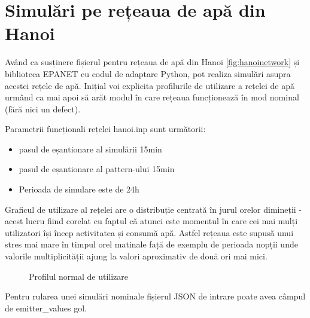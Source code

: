 

\section{Simulări pe rețeaua de apă din Hanoi}

Având ca susținere fișierul pentru rețeaua de apă din Hanoi \ref{fig:hanoinetwork} și biblioteca EPANET cu codul de
adaptare Python, pot realiza simulări asupra acestei rețele de apă. Inițial voi explicita profilurile de utilizare a
rețelei de apă urmând ca mai apoi să arăt modul în care rețeaua funcționează în mod nominal (fără nici un defect).

Parametrii funcționali rețelei hanoi.inp sunt următorii:

\begin{itemize}
    \item pasul de eșantionare al simulării 15min
    \item pasul de eșantionare al pattern-ului 15min
    \item Perioada de simulare este de 24h
\end{itemize}

Graficul de utilizare al rețelei are o distribuție centrată în jurul orelor dimineții - acest lucru fiind corelat cu faptul că atunci este momentul în care cei mai mulți utilizatori își încep activitatea și consumă apă. Astfel rețeaua este supusă unui stres mai mare în timpul orel matinale față de exemplu de perioada nopții unde valorile multiplicității ajung la valori aproximativ de două ori mai mici.

\begin{figure}[htbp]
  \centering
  
  \caption{Profilul normal de utilizare}
\end{figure}

Pentru rularea unei simulări nominale fișierul JSON de intrare poate avea câmpul de emitter\_values gol.
